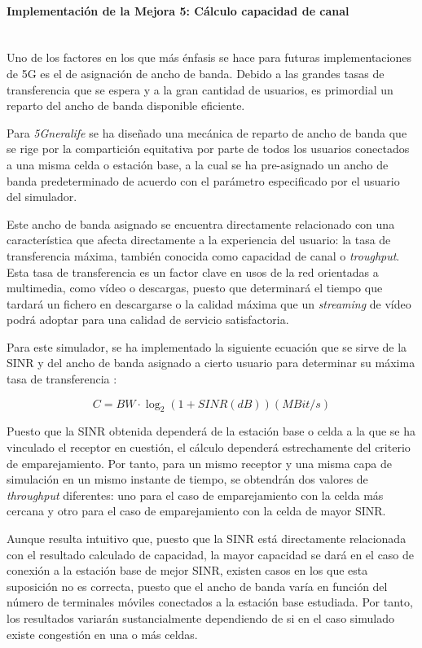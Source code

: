 \paragraph{Implementación de la Mejora 5: Cálculo capacidad de canal} \mbox{} \\

Uno de los factores en los que más énfasis se hace para futuras implementaciones de 5G es el de asignación de ancho de banda. Debido a las grandes tasas de transferencia que se espera y a la gran cantidad de usuarios, es primordial un reparto del ancho de banda disponible eficiente.

Para \textit{5Gneralife} se ha diseñado una mecánica de reparto de ancho de banda que se rige por la compartición equitativa por parte de todos los usuarios conectados a una misma celda o estación base, a la cual se ha pre-asignado un ancho de banda predeterminado de acuerdo con el parámetro especificado por el usuario del simulador.

Este ancho de banda asignado se encuentra directamente relacionado con una característica que afecta directamente a la experiencia del usuario: la tasa de transferencia máxima, también conocida como capacidad de canal o \textit{troughput}. Esta tasa de transferencia es un factor clave en usos de la red orientadas a multimedia, como vídeo o descargas, puesto que determinará el tiempo que tardará un fichero en descargarse o la calidad máxima que un \textit{streaming} de vídeo podrá adoptar para una calidad de servicio satisfactoria.

Para este simulador, se ha implementado la siguiente ecuación que se sirve de la SINR y del ancho de banda asignado a cierto usuario para determinar su máxima tasa de transferencia \cite{capacity}:

$$C = BW · \log_{2}( 1 + SINR(dB) ) (MBit/s) $$

Puesto que la SINR obtenida dependerá de la estación base o celda a la que se ha vinculado el receptor en cuestión, el cálculo dependerá estrechamente del criterio de emparejamiento. Por tanto, para un mismo receptor y una misma capa de simulación en un mismo instante de tiempo, se obtendrán dos valores de \textit{throughput} diferentes: uno para el caso de emparejamiento con la celda más cercana y otro para el caso de emparejamiento con la celda de mayor SINR.

Aunque resulta intuitivo que, puesto que la SINR está directamente relacionada con el resultado calculado de capacidad, la mayor capacidad se dará en el caso de conexión a la estación base de mejor SINR, existen casos en los que esta suposición no es correcta, puesto que el ancho de banda varía en función del número de terminales móviles conectados a la estación base estudiada. Por tanto, los resultados variarán sustancialmente dependiendo de si en el caso simulado existe congestión en una o más celdas.

